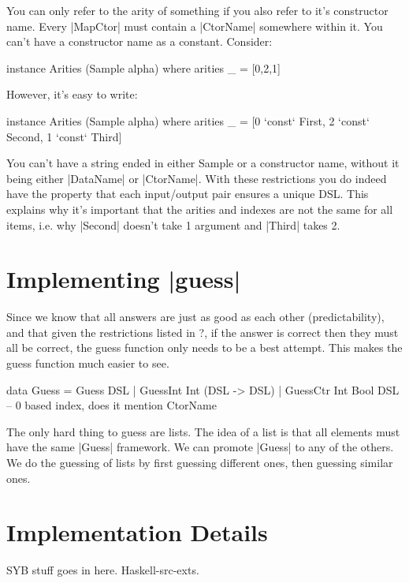 \documentclass[preprint]{sigplanconf}
\begin{document}
You can only refer to the arity of something if you also refer to it's constructor name. Every |MapCtor| must contain a |CtorName| somewhere within it. You can't have a constructor name as a constant. Consider:

\begin{code}
instance Arities (Sample alpha) where
    arities _ = [0,2,1]
\end{code}

However, it's easy to write:

\begin{code}
instance Arities (Sample alpha) where
    arities _ = [0 `const` First{}, 2 `const` Second{}, 1 `const` Third{}]
\end{code}

You can't have a string ended in either Sample or a constructor name, without it being either |DataName| or |CtorName|.
With these restrictions you do indeed have the property that each input/output pair ensures a unique DSL. This explains why it's important that the arities and indexes are not the same for all items, i.e. why |Second| doesn't take 1 argument and |Third| takes 2.

\section{Implementing |guess|}

Since we know that all answers are just as good as each other (predictability), and that given the restrictions listed in ?, if the answer is correct then they must all be correct, the guess function only needs to be a best attempt. This makes the guess function much easier to see.

\begin{code}
data Guess = Guess DSL
           | GuessInt Int (DSL -> DSL)
           | GuessCtr Int Bool DSL  -- 0 based index, does it mention CtorName
\end{code}

The only hard thing to guess are lists. The idea of a list is that all elements must have the same |Guess| framework. We can promote |Guess| to any of the others. We do the guessing of lists by first guessing different ones, then guessing similar ones.

\section{Implementation Details}

SYB stuff goes in here. Haskell-src-exts.
\end{document}
